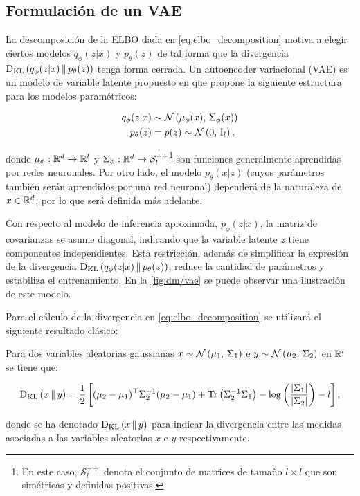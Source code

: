 \subsection{Formulación de un VAE}
\label{dm/vae/formulation}

La descomposición de la ELBO dada en \eqref{eq:elbo_decomposition} motiva a elegir ciertos modelos $q_\phi(z|x)$ y $p_\theta(z)$ de tal forma que la divergencia $\operatorname{D_{KL}}\left(q_\phi(z|x)\,\|\,p_\theta(z)\right)$ tenga forma cerrada. Un autoencoder variacional (VAE) es un modelo de variable latente propuesto en \cite{kingma2022autoencoding} que propone la siguiente estructura para los modelos paramétricos:

\begin{align}
    q_\phi(z|x) & \sim \mathcal{N}\left(\mu_\phi(x),\,\Sigma_\phi(x)\right) \label{eq:vae_model_posterior} \\
    p_\theta(z) & = p(z) \sim \mathcal{N}\left(0,\,\operatorname{I}_{l}\right) \label{eq:vae_model_prior},
\end{align}

donde $\mu_\phi:\mathbb{R}^d\to\mathbb{R}^l$ y $\Sigma_\phi:\mathbb{R}^d\to\mathcal{S}_l^{++}$\footnote{En este caso, $\mathcal{S}_l^{++}$ denota el conjunto de matrices de tamaño $l\times l$ que son simétricas y definidas positivas.} son funciones generalmente aprendidas por redes neuronales. Por otro lado, el modelo $p_\theta(x|z)$ (cuyos parámetros también serán aprendidos por una red neuronal) dependerá de la naturaleza de $x\in\mathbb{R}^d$, por lo que será definida más adelante.

Con respecto al modelo de inferencia aproximada, $p_\phi(z|x)$, la matriz de covarianzas se asume diagonal, indicando que la variable latente $z$ tiene componentes independientes. Esta restricción, además de simplificar la expresión de la divergencia $\operatorname{D_{KL}}\left(q_\phi(z|x)\,\|\,p_\theta(z)\right)$, reduce la cantidad de parámetros y estabiliza el entrenamiento. En la \autoref{fig:dm/vae} se puede observar una ilustración de este modelo.


Para el cálculo de la divergencia en \eqref{eq:elbo_decomposition} se utilizará el siguiente resultado clásico:

\begin{teo}
    \label{teo:kl_gaussians}

    Para dos variables aleatorias gaussianas $x\sim\mathcal{N}\left(\mu_1,\,\Sigma_1\right)$ e $y\sim\mathcal{N}\left(\mu_2,\,\Sigma_2\right)$ en $\mathbb{R}^l$ se tiene que:

    \begin{equation*}
        \operatorname{D_{KL}}\left(x\,\|\,y\right) = \frac{1}{2}\left[(\mu_2-\mu_1)^\top\Sigma_2^{-1}(\mu_2-\mu_1) + \operatorname{Tr}\left(\Sigma_2^{-1}\Sigma_1\right) - \log\left(\frac{|\Sigma_1|}{|\Sigma_2|}\right)-l\right],
    \end{equation*}

    donde se ha denotado $\operatorname{D_{KL}}\left(x\,\|\,y\right)$ para indicar la divergencia entre las medidas asociadas a las variables aleatorias $x$ e $y$ respectivamente.
\end{teo}

